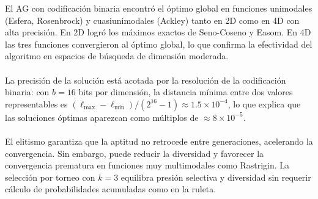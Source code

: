 \documentclass[11pt]{article}
\begin{document}
El AG con codificaci\'on binaria encontr\'o el \'optimo global en funciones unimodales (Esfera, Rosenbrock) y cuasiunimodales (Ackley) tanto en 2D como en 4D con alta precisi\'on. En 2D logr\'o los m\'aximos exactos de Seno-Coseno y Easom. En 4D las tres funciones convergieron al \'optimo global, lo que confirma la efectividad del algoritmo en espacios de b\'usqueda de dimensi\'on moderada.\\\\
La precisi\'on de la soluci\'on est\'a acotada por la resoluci\'on de la codificaci\'on binaria: con $b = 16$ bits por dimensi\'on, la distancia m\'inima entre dos valores representables es $(\ell_{\max}-\ell_{\min})/(2^{16}-1) \approx 1.5\times10^{-4}$, lo que explica que las soluciones \'optimas aparezcan como m\'ultiplos de $\approx 8\times10^{-5}$.\\\\
El elitismo garantiza que la aptitud no retrocede entre generaciones, acelerando la convergencia. Sin embargo, puede reducir la diversidad y favorecer la convergencia prematura en funciones muy multimodales como Rastrigin. La selecci\'on por torneo con $k=3$ equilibra presi\'on selectiva y diversidad sin requerir c\'alculo de probabilidades acumuladas como en la ruleta.
\end{document}
